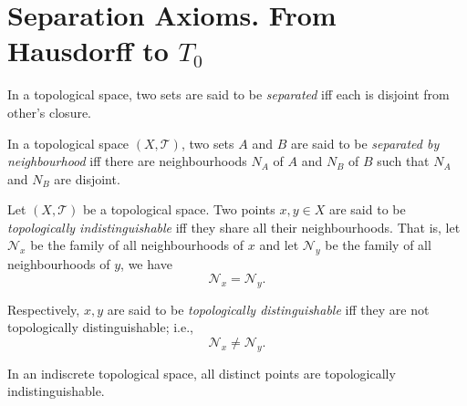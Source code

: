 \section{Separation Axioms. From Hausdorff to $T_0$}





\begin{definition}
	[saperated]
	\label{def: seperated}
	In a topological space, two sets are said to be \textit{separated} iff each is disjoint from other's closure.
\end{definition}


\begin{definition}
	\label{def: separated by neighbourhoods}
	In a topological space $(X, \mathcal T)$, two sets $A$ and $B$ are said to be \textit{separated by neighbourhood} iff there are neighbourhoods $N_A$ of $A$ and $N_B$ of $B$ such that $N_A$ and $N_B$ are disjoint.
\end{definition}


\begin{definition}
	\label{def: topologically indistinguishable}
	Let $(X, \mathcal T)$ be a topological space. Two points $x,y \in X$ are said to be \textit{topologically indistinguishable} iff they share all their neighbourhoods. That is, let $\mathcal N_x$ be the family of all neighbourhoods of $x$ and let $\mathcal N_y$ be the family of all neighbourhoods of $y$, we have
	$$
	\mathcal N_x = \mathcal N_y.
	$$
	
	Respectively, $x,y$ are said to be \textit{topologically distinguishable} iff they are not topologically distinguishable; i.e.,
	$$
	\mathcal N_x \ne \mathcal N_y.
	$$
\end{definition}


\begin{example}
	In an indiscrete topological space, all distinct points are topologically indistinguishable.
\end{example}


